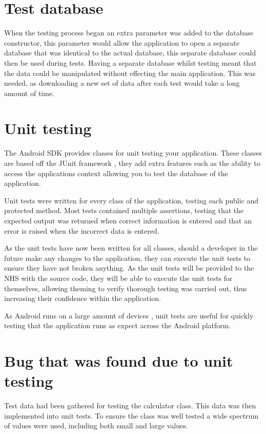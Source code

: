 \section{Test database}

When the testing process began an extra parameter was added to the database constructor, this parameter would allow the application to open a separate database that was identical to the actual database, this separate database could then be used during tests. Having a separate database whilst testing meant that the data could be manipulated without effecting the main application. This was needed, as downloading a new set of data after each test would take a long amount of time.

\section{Unit testing}

The Android SDK \cite{android_sdk} provides classes for unit testing your application. These classes are based off the JUnit framework \cite{junit}, they add extra features such as the ability to access the applications context allowing you to test the database of the application.

Unit tests \cite{junit} were written for every class of the application, testing each public and protected method. Most tests contained multiple assertions, testing that the expected output was returned when correct information is entered and that an error is raised when the incorrect data is entered.

As the unit tests have now been written for all classes, should a developer in the future make any changes to the application, they can execute the unit tests to ensure they have not broken anything. As the unit tests will be provided to the NHS with the source code, they will be able to execute the unit tests for themselves, allowing theming to verify thorough testing was carried out, thus increasing their confidence within the application.

As Android runs on a large amount of devices \cite{phone_market}, unit tests are useful for quickly testing that the application runs as expect across the Android platform. 


\section{Bug that was found due to unit testing}

Test data had been gathered for testing the calculator class. This data was then implemented into unit tests. To ensure the class was well tested a wide spectrum of values were used, including both small and large values.

